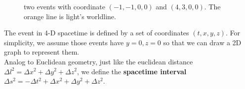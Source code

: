 \documentclass[12pt]{article}
\theoremstyle{mystyle}{\newtheorem{definition}{Definition}[section]}
\theoremstyle{mystyle}{\newtheorem{theorem}[definition]{Theorem}}
\theoremstyle{mystyle}{\newtheorem*{remark}{Remark}}
\theoremstyle{mystyle}{\newtheorem*{example}{Example}}
\theoremstyle{mystyle}{\newtheorem*{examples}{Examples}}
\theoremstyle{cstyle}{\newtheorem*{cthm}{}}
\begin{document}
\begin{figure}[ht]
  \begin{center}
    \caption[]{two events with coordinate $(-1, -1, 0, 0)$ and $(4, 3, 0, 0)$. The orange line is light's worldline.}
  \end{center}
\end{figure}

The event in 4-D spacetime is defined by a set of coordinates \((t, x, y, z)\).
For simplicity, we assume those events have $y=0, z=0$ so that we can draw a 2D graph to represent them.\\
Analog to Euclidean geometry, just like the euclidean distance \(\Delta l^2 = \Delta x^2 + \Delta y^2 + \Delta z^2\), we define the
\textbf{spacetime interval} $\Delta s^2 = - \Delta t^2 + \Delta x^2 + \Delta y^2 + \Delta z^2$.
\end{document}
